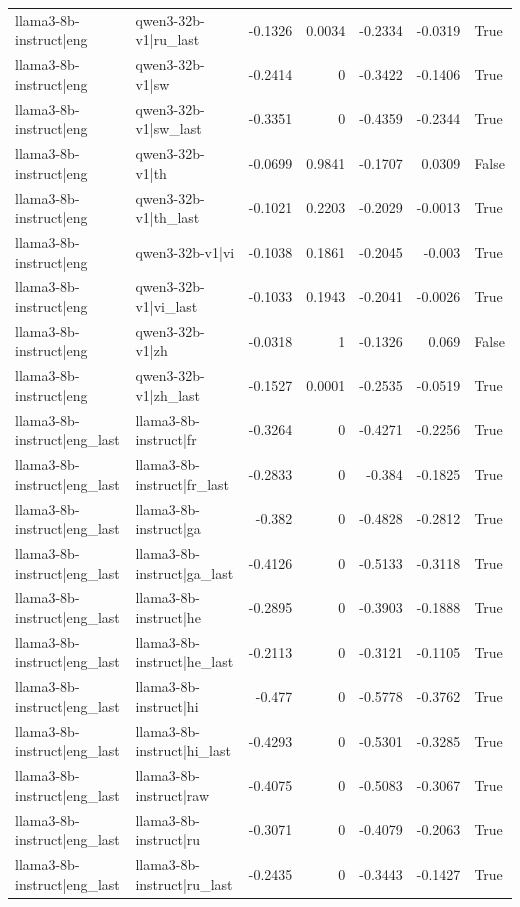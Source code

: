 \begin{table}
\begin{tabular}{l l r r r r l}
llama3-8b-instruct|eng & qwen3-32b-v1|ru_last & -0.1326 & 0.0034 & -0.2334 & -0.0319 & True \\
llama3-8b-instruct|eng & qwen3-32b-v1|sw & -0.2414 & 0 & -0.3422 & -0.1406 & True \\
llama3-8b-instruct|eng & qwen3-32b-v1|sw_last & -0.3351 & 0 & -0.4359 & -0.2344 & True \\
llama3-8b-instruct|eng & qwen3-32b-v1|th & -0.0699 & 0.9841 & -0.1707 & 0.0309 & False \\
llama3-8b-instruct|eng & qwen3-32b-v1|th_last & -0.1021 & 0.2203 & -0.2029 & -0.0013 & True \\
llama3-8b-instruct|eng & qwen3-32b-v1|vi & -0.1038 & 0.1861 & -0.2045 & -0.003 & True \\
llama3-8b-instruct|eng & qwen3-32b-v1|vi_last & -0.1033 & 0.1943 & -0.2041 & -0.0026 & True \\
llama3-8b-instruct|eng & qwen3-32b-v1|zh & -0.0318 & 1 & -0.1326 & 0.069 & False \\
llama3-8b-instruct|eng & qwen3-32b-v1|zh_last & -0.1527 & 0.0001 & -0.2535 & -0.0519 & True \\
llama3-8b-instruct|eng_last & llama3-8b-instruct|fr & -0.3264 & 0 & -0.4271 & -0.2256 & True \\
llama3-8b-instruct|eng_last & llama3-8b-instruct|fr_last & -0.2833 & 0 & -0.384 & -0.1825 & True \\
llama3-8b-instruct|eng_last & llama3-8b-instruct|ga & -0.382 & 0 & -0.4828 & -0.2812 & True \\
llama3-8b-instruct|eng_last & llama3-8b-instruct|ga_last & -0.4126 & 0 & -0.5133 & -0.3118 & True \\
llama3-8b-instruct|eng_last & llama3-8b-instruct|he & -0.2895 & 0 & -0.3903 & -0.1888 & True \\
llama3-8b-instruct|eng_last & llama3-8b-instruct|he_last & -0.2113 & 0 & -0.3121 & -0.1105 & True \\
llama3-8b-instruct|eng_last & llama3-8b-instruct|hi & -0.477 & 0 & -0.5778 & -0.3762 & True \\
llama3-8b-instruct|eng_last & llama3-8b-instruct|hi_last & -0.4293 & 0 & -0.5301 & -0.3285 & True \\
llama3-8b-instruct|eng_last & llama3-8b-instruct|raw & -0.4075 & 0 & -0.5083 & -0.3067 & True \\
llama3-8b-instruct|eng_last & llama3-8b-instruct|ru & -0.3071 & 0 & -0.4079 & -0.2063 & True \\
llama3-8b-instruct|eng_last & llama3-8b-instruct|ru_last & -0.2435 & 0 & -0.3443 & -0.1427 & True \\

\end{tabular}
\end{table}
